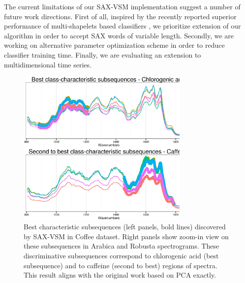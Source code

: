 \documentclass[conference]{IEEEtran}
\begin{document}
The current limitations of our SAX-VSM implementation suggest a number of future work directions. 
First of all, inspired by the recently reported superior performance of multi-shapelets based classifiers
\cite{bagnal}, we prioritize extension of our algorithm in order to accept SAX words of variable length.
Secondly, we are working on alternative parameter optimization scheme in order to reduce classifier 
training time. Finally, we are evaluating an extension to multidimensional time series.

\begin{figure}[t]
   \centering
   \vspace{-0.2cm}
   \includegraphics[width=84mm]{figures/coffee_patterns.ps}
   \caption{
   Best characteristic subsequences (left panels, bold lines) discovered by SAX-VSM in
   {Coffee dataset}. Right panels show zoom-in view on these subsequences in Arabica
   and Robusta spectrograms.
   These discriminative subsequences correspond to chlorogenic acid (best subsequence) 
   and to caffeine (second to best) regions of spectra. This result aligns with
   the original work based on PCA \cite{coffee} exactly.
   }
   \label{fig:coffee}
   \vspace{-0.2cm}
\end{figure}
\end{document}
